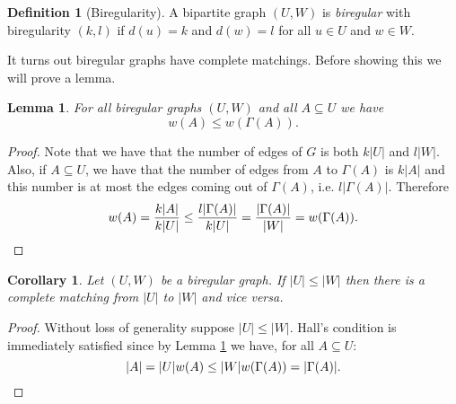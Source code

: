 \documentclass{report}
\theoremstyle{definition}
\theoremstyle{plain}
\newtheorem{lem}[thm]{Lemma}
\newtheorem{coro}[thm]{Corollary}
\theoremstyle{definition}
\newtheorem{defn}[thm]{Definition}
\begin{document}
 	\begin{defn}[Biregularity]
 		A bipartite graph $(U,W)$ is \emph{biregular} with biregularity $(k,l)$ if $d(u) = k$ and $d(w) = l$ for all $u\in U$ and $w\in W$.
 	\end{defn}
 	It turns out biregular graphs have complete matchings. Before showing this we will prove a lemma.
 	\begin{lem}\label{lem:bir_wei_ineq}
 		For all biregular graphs $(U,W)$ and all $A\subseteq U$ we have
 		\[
 			w(A) \leq w(\Gamma(A)).
 		\]
 	\end{lem}
 	\begin{proof}
 		Note that we have that the number of edges of $G$ is both $k|U|$ and $l|W|$. Also, if $A\subseteq U$, we have that the number of edges from $A$ to $\Gamma(A)$ is $k|A|$ and this number is at most the edges coming out of $\Gamma(A)$, i.e. $l|\Gamma(A)|$. Therefore
 		\[
 			w(A) = \frac{k|A|}{k|U|} \leq \frac{l|\Gamma(A)|}{k|U|} = \frac{|\Gamma(A)|}{|W|} = w(\Gamma(A)).\qedhere
 		\]
 	\end{proof}
 	\begin{coro}\label{coro:bir_comp_match}
 		Let $(U,W)$ be a biregular graph. If $|U|\leq |W|$ then there is a complete matching from $|U|$ to $|W|$ and vice versa. 
 	\end{coro}
 	\begin{proof}
 		Without loss of generality suppose $|U|\leq |W|$. Hall's condition is immediately satisfied since by Lemma \ref{lem:bir_wei_ineq} we have, for all $A\subseteq U$:
 		\[
 			|A| = |U|w(A) \leq |W| w(\Gamma(A)) = |\Gamma(A)|. \qedhere
 		\]
 	\end{proof} 	
\end{document}
